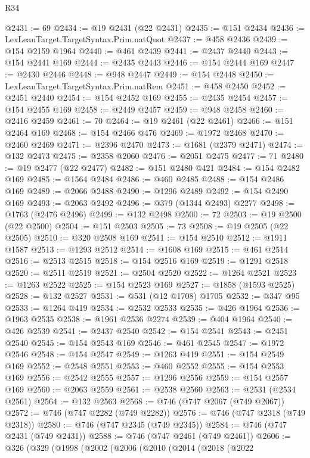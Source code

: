 \begin{lexlean}{R34}
\begin{coremodule}
@2431 := 69
@2434 := @19 @2431 (@22 @2431)
@2435 := @151 @2434
@2436 := LexLeanTarget.TargetSyntax.Prim.natQuot
@2437 := @458 @2436
@2439 := @154 @2159 @1964
@2440 := @461 @2439
@2441 := @2437 @2440
@2443 := @154 @2441 @169
@2444 := @2435 @2443
@2446 := @154 @2444 @169
@2447 := @2430 @2446
@2448 := @948 @2447
@2449 := @154 @2448
@2450 := LexLeanTarget.TargetSyntax.Prim.natRem
@2451 := @458 @2450
@2452 := @2451 @2440
@2454 := @154 @2452 @169
@2455 := @2435 @2454
@2457 := @154 @2455 @169
@2458 := @2449 @2457
@2459 := @948 @2458
@2460 := @2416 @2459
@2461 := 70
@2464 := @19 @2461 (@22 @2461)
@2466 := @151 @2464 @169
@2468 := @154 @2466 @476
@2469 := @1972 @2468
@2470 := @2460 @2469
@2471 := @2396 @2470
@2473 := @1681 (@2379 @2471)
@2474 := @132 @2473
@2475 := @2358 @2060
@2476 := @2051 @2475
@2477 := 71
@2480 := @19 @2477 (@22 @2477)
@2482 := @151 @2480 @421
@2484 := @154 @2482 @169
@2485 := @1564 @2484
@2486 := @460 @2485
@2488 := @154 @2486 @169
@2489 := @2066 @2488
@2490 := @1296 @2489
@2492 := @154 @2490 @169
@2493 := @2063 @2492
@2496 := @379 (@1344 @2493) @2277
@2498 := @1763 (@2476 @2496)
@2499 := @132 @2498
@2500 := 72
@2503 := @19 @2500 (@22 @2500)
@2504 := @151 @2503
@2505 := 73
@2508 := @19 @2505 (@22 @2505)
@2510 := @320 @2508 @169
@2511 := @154 @2510
@2512 := @1911 @1587
@2513 := @1293 @2512
@2514 := @1608 @169
@2515 := @461 @2514
@2516 := @2513 @2515
@2518 := @154 @2516 @169
@2519 := @1291 @2518
@2520 := @2511 @2519
@2521 := @2504 @2520
@2522 := @1264 @2521
@2523 := @1263 @2522
@2525 := @154 @2523 @169
@2527 := @1858 (@1593 @2525)
@2528 := @132 @2527
@2531 := @531 (@12 @1708) @1705
@2532 := @347 @95
@2533 := @1264 @419
@2534 := @2532 @2533
@2535 := @426 @1964
@2536 := @1963 @2535
@2538 := @1961 @2536 @2274
@2539 := @404 @1964
@2540 := @426 @2539
@2541 := @2437 @2540
@2542 := @154 @2541
@2543 := @2451 @2540
@2545 := @154 @2543 @169
@2546 := @461 @2545
@2547 := @1972 @2546
@2548 := @154 @2547
@2549 := @1263 @419
@2551 := @154 @2549 @169
@2552 := @2548 @2551
@2553 := @460 @2552
@2555 := @154 @2553 @169
@2556 := @2542 @2555
@2557 := @1296 @2556
@2559 := @154 @2557 @169
@2560 := @2063 @2559
@2561 := @2538 @2560
@2563 := @2531 (@2534 @2561)
@2564 := @132 @2563
@2568 := @746 (@747 @2067 (@749 @2067))
@2572 := @746 (@747 @2282 (@749 @2282))
@2576 := @746 (@747 @2318 (@749 @2318))
@2580 := @746 (@747 @2345 (@749 @2345))
@2584 := @746 (@747 @2431 (@749 @2431))
@2588 := @746 (@747 @2461 (@749 @2461))
@2606 := @326
    (@329
      (@1998
        (@2002
          (@2006
            (@2010
              (@2014
                (@2018
                  (@2022

\end{coremodule}
\end{lexlean}
